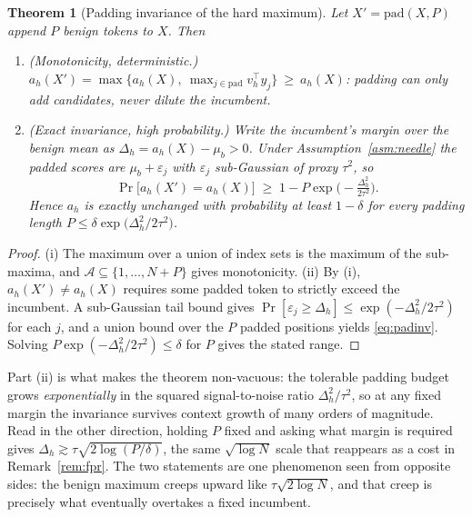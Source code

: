 \documentclass[10pt]{article}
\theoremstyle{plain}
\newtheorem{theorem}{Theorem}[section]
\theoremstyle{definition}
\theoremstyle{remark}
\begin{document}
\begin{theorem}[Padding invariance of the hard maximum]
\label{thm:multimax}
Let $X'=\mathrm{pad}(X,P)$ append $P$ benign tokens to $X$. Then
\begin{enumerate}[label=(\roman*),leftmargin=2.2em,itemsep=1pt,topsep=2pt]
  \item \emph{(Monotonicity, deterministic.)}
        $a_h(X')=\max\{a_h(X),\ \max_{j\in\mathrm{pad}}v_h^\top y_j\}\ \ge\ a_h(X)$:
        padding can only add candidates, never dilute the incumbent.
  \item \emph{(Exact invariance, high probability.)} Write the incumbent's margin over
        the benign mean as $\Delta_h=a_h(X)-\mu_b>0$. Under Assumption~\ref{asm:needle}
        the padded scores are $\mu_b+\varepsilon_j$ with $\varepsilon_j$ sub-Gaussian of
        proxy $\tau^2$, so
        \begin{equation}
          \Pr\big[a_h(X')=a_h(X)\big]
          \;\ge\; 1-P\exp\!\Big(-\tfrac{\Delta_h^{2}}{2\tau^{2}}\Big).
          \label{eq:padinv}
        \end{equation}
        Hence $a_h$ is \emph{exactly} unchanged with probability at least $1-\delta$ for
        every padding length
        $P\le\delta\exp\!\big(\Delta_h^{2}/2\tau^{2}\big)$.
\end{enumerate}
\end{theorem}
\begin{proof}
(i) The maximum over a union of index sets is the maximum of the sub-maxima, and
$\mathcal{A}\subseteq\{1,\dots,N+P\}$ gives monotonicity. (ii) By (i), $a_h(X')\neq a_h(X)$
requires some padded token to strictly exceed the incumbent. A sub-Gaussian tail bound
gives $\Pr[\varepsilon_j\ge\Delta_h]\le\exp(-\Delta_h^2/2\tau^2)$ for each $j$, and a union
bound over the $P$ padded positions yields \eqref{eq:padinv}. Solving
$P\exp(-\Delta_h^2/2\tau^2)\le\delta$ for $P$ gives the stated range.
\end{proof}

Part (ii) is what makes the theorem non-vacuous: the tolerable padding budget grows
\emph{exponentially} in the squared signal-to-noise ratio $\Delta_h^2/\tau^2$, so at any
fixed margin the invariance survives context growth of many orders of magnitude. Read in
the other direction, holding $P$ fixed and asking what margin is required gives
$\Delta_h\gtrsim\tau\sqrt{2\log(P/\delta)}$, the same $\sqrt{\log N}$ scale that
reappears as a cost in Remark~\ref{rem:fpr}. The two statements are one phenomenon seen
from opposite sides: the benign maximum creeps upward like $\tau\sqrt{2\log N}$, and that
creep is precisely what eventually overtakes a fixed incumbent.
\end{document}
